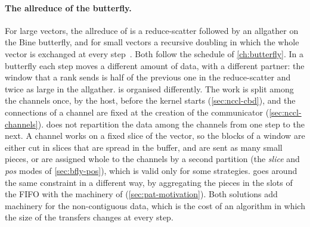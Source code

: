 \paragraph{The allreduce of the butterfly.}
For large vectors, the allreduce of \bine{} is a reduce-scatter followed by an allgather on the Bine butterfly, and for small vectors a recursive doubling in which the whole vector is exchanged at every step~\cite{desensi2025bine}.
Both follow the schedule of \cref{ch:butterfly}.
In a butterfly each step moves a different amount of data, with a different partner: the window that a rank sends is half of the previous one in the reduce-scatter and twice as large in the allgather.
\nccl{} is organised differently.
The work is split among the channels once, by the host, before the kernel starts (\cref{sec:nccl-cbd}), and the connections of a channel are fixed at the creation of the communicator (\cref{sec:nccl-channels}). \nccl{} does not repartition the data among the channels from one step to the next.
A channel works on a fixed slice of the vector, so the blocks of a window are either cut in slices that are spread in the buffer, and are sent as many small pieces, or are assigned whole to the channels by a second partition (the \emph{slice} and \emph{pos} modes of \cref{sec:bfly-pos}), which is valid only for some strategies.
 goes around the same constraint in a different way, by aggregating the pieces in the slots of the FIFO with the machinery of \pat{} (\cref{sec:pat-motivation}).
Both solutions add machinery for the non-contiguous data, which is the cost of an algorithm in which the size of the transfers changes at every step.
